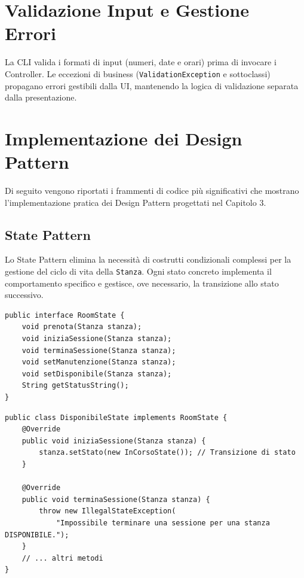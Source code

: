 \section{Validazione Input e Gestione Errori}
La CLI valida i formati di input (numeri, date e orari) prima di invocare i Controller. Le eccezioni di business (\texttt{ValidationException} e sottoclassi) propagano errori gestibili dalla UI, mantenendo la logica di validazione separata dalla presentazione.

\section{Implementazione dei Design Pattern}

Di seguito vengono riportati i frammenti di codice più significativi che mostrano l'implementazione pratica dei Design Pattern progettati nel Capitolo 3.

\subsection{State Pattern}
Lo State Pattern elimina la necessità di costrutti condizionali complessi per la gestione del ciclo di vita della \texttt{Stanza}. Ogni stato concreto implementa il comportamento specifico e gestisce, ove necessario, la transizione allo stato successivo.

\begin{lstlisting}[caption={Interfaccia dello State Pattern (\texttt{RoomState.java})}, label={lst:state_interface}]
public interface RoomState {
    void prenota(Stanza stanza);
    void iniziaSessione(Stanza stanza);
    void terminaSessione(Stanza stanza);
    void setManutenzione(Stanza stanza);
    void setDisponibile(Stanza stanza);
    String getStatusString();
}
\end{lstlisting}

\begin{lstlisting}[caption={Stato concreto (\texttt{DisponibileState.java})}, label={lst:state_concrete}]
public class DisponibileState implements RoomState {
    @Override
    public void iniziaSessione(Stanza stanza) {
        stanza.setStato(new InCorsoState()); // Transizione di stato
    }
    
    @Override
    public void terminaSessione(Stanza stanza) {
        throw new IllegalStateException(
            "Impossibile terminare una sessione per una stanza DISPONIBILE.");
    }
    // ... altri metodi
}
\end{lstlisting}


